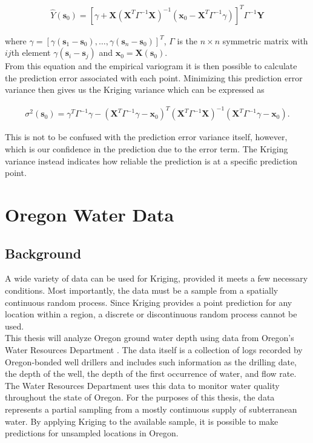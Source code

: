 \documentclass[12pt,twoside]{reedthesis}
\begin{document}
\begin{align*}
\hat Y(\mathbf{s}_0) = [\gamma + \mathbf{X}(\mathbf{X}^T\Gamma^{-1}\mathbf{X})^{-1}(\mathbf{x}_0 - \mathbf{X}^T\Gamma^{-1}\gamma)]^T\Gamma^{-1}\mathbf{Y}
\end{align*}

where $\gamma = [\gamma(\mathbf{s}_1 - \mathbf{s}_0), \dots, \gamma(\mathbf{s}_n - \mathbf{s}_0)]^T$, $\Gamma$ is the $n \times n$ symmetric matrix with $ij$th element $\gamma(\mathbf{s}_i - \mathbf{s}_j)$ and $\mathbf{x}_0 = \mathbf{X}(\mathbf{s}_0)$. \\

From this equation and the empirical variogram it is then possible to calculate the prediction error associated with each point. Minimizing this prediction error variance then gives us the Kriging variance which can be expressed as

\begin{align*}
\sigma^2(\mathbf{s}_0) = \gamma^T\Gamma^{-1}\gamma - (\mathbf{X}^T\Gamma^{-1}\gamma - \mathbf{x}_0)^T(\mathbf{X}^T\Gamma^{-1}\mathbf{X})^{-1}(\mathbf{X}^T\Gamma^{-1}\gamma - \mathbf{x}_0).
\end{align*}

This is not to be confused with the prediction error variance itself, however, which is our confidence in the prediction due to the error term. The Kriging variance instead indicates how reliable the prediction is at a specific prediction point.



\chapter{Oregon Water Data}

\section{Background}
A wide variety of data can be used for Kriging, provided it meets a few necessary conditions. Most importantly, the data must be a sample from a spatially continuous random process. Since Kriging provides a point prediction for any location within a region, a discrete or discontinuous random process cannot be used. \\

This thesis will analyze Oregon ground water depth using data from Oregon's Water Resources Department \cite{groundwater}. The data itself is a collection of logs recorded by Oregon-bonded well drillers and includes such information as the drilling date, the depth of the well, the depth of the first occurrence of water, and flow rate. The Water Resources Department uses this data to monitor water quality throughout the state of Oregon. For the purposes of this thesis, the data represents a partial sampling from a mostly continuous supply of subterranean water. By applying Kriging to the available sample, it is possible to make predictions for unsampled locations in Oregon. \\
\end{document}
